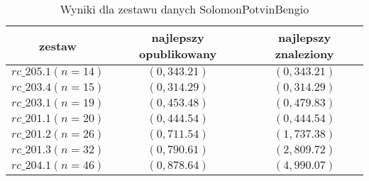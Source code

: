 \begin{frame}
\begin{table}
\centering
\caption{Wyniki dla zestawu danych SolomonPotvinBengio}
\begin{tabular}{c|c|c}
zestaw & najlepszy opublikowany & najlepszy znaleziony \\ \hline
$rc\_205.1 (n=14)$ & $(0, 343.21)$ & $(0, 343.21)$ \\
$rc\_203.4 (n=15)$ & $(0, 314.29)$ & $(0, 314.29)$ \\
$rc\_203.1 (n=19)$ & $(0, 453.48)$ & $(0, 479.83)$ \\
$rc\_201.1 (n=20)$ & $(0, 444.54)$ & $(0, 444.54)$ \\
$rc\_201.2 (n=26)$ & $(0, 711.54)$ & $(1, 737.38)$ \\
$rc\_201.3 (n=32)$ & $(0, 790.61)$ & $(2, 809.72)$ \\
$rc\_204.1 (n=46)$ & $(0, 878.64)$ & $(4, 990.07)$ 
\end{tabular}
\end{table}
\end{frame}
